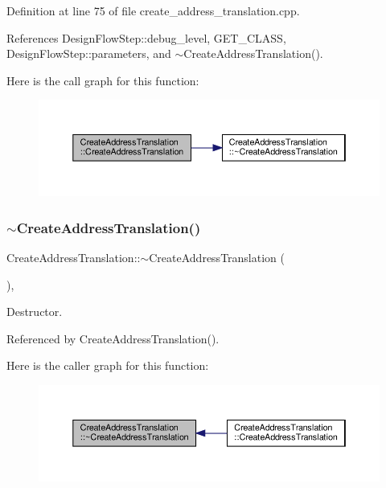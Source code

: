 Definition at line 75 of file create\+\_\+address\+\_\+translation.\+cpp.



References Design\+Flow\+Step\+::debug\+\_\+level, G\+E\+T\+\_\+\+C\+L\+A\+SS, Design\+Flow\+Step\+::parameters, and $\sim$\+Create\+Address\+Translation().

Here is the call graph for this function\+:
\nopagebreak
\begin{figure}[H]
\begin{center}
\leavevmode
\includegraphics[width=350pt]{d1/d40/classCreateAddressTranslation_a15b94b6810b67ea5d972a8bd4a4e2827_cgraph}
\end{center}
\end{figure}
\mbox{\label{classCreateAddressTranslation_ab1a2d19591190aa85668b851f12f103c}} 
\subsubsection{\texorpdfstring{$\sim$\+Create\+Address\+Translation()}{~CreateAddressTranslation()}}
{\footnotesize\ttfamily Create\+Address\+Translation\+::$\sim$\+Create\+Address\+Translation (\begin{DoxyParamCaption}{ }\end{DoxyParamCaption})\hspace{0.3cm}{\ttfamily [override]}, {\ttfamily [default]}}



Destructor. 



Referenced by Create\+Address\+Translation().

Here is the caller graph for this function\+:
\nopagebreak
\begin{figure}[H]
\begin{center}
\leavevmode
\includegraphics[width=350pt]{d1/d40/classCreateAddressTranslation_ab1a2d19591190aa85668b851f12f103c_icgraph}
\end{center}
\end{figure}


